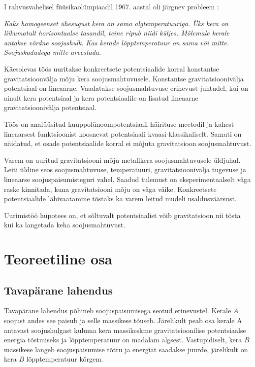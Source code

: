 \documentclass{trkut}%
\begin{document}
\maketitle%
\tableofcontents%
\nummerdame%
I rahvusvahelisel füüsikaolümpiaadil 1967. aastal oli järgnev probleem \cite{ipho67}:

\textit{Kaks homogeenset ühesugust kera on sama algtemperatuuriga. Üks kera on liikumatult horisontaalse tasandil, teine ripub niidi küljes. Mõlemale kerale antakse võrdne soojushulk. Kas kerade lõpptemperatuur on sama või mitte. Soojuskadudega mitte arvestada.}

Käesolevas töös uuritakse konkreetsete potentsiaalide korral konstantse gravitatsioonvälja mõju kera soojusmahtuvusele.
Konstantse gravitatsioonivälja potentsiaal on lineaarne.
Vaadatakse soojusmahtuvuse erinevust juhtudel, kui on ainult kera potentsiaal ja kera potentsiaalile on lisatud lineaarne gravitatsioonivälja potentsiaal.

Töös on analüüsitud kuuppolünoompotentsiaali häirituse meetodil ja kahest lineaarsest funktsioonist koosnevat potentsiaali kvaasi-klassikaliselt. Samuti on näidatud, et osade potentsiaalide korral ei mõjuta gravitatsioon soojusmahtuvust.

Varem on uuritud gravitatsiooni mõju metallkera soojusmahtuvusele üldjuhul.
Leiti üldine seos soojusmahtuvuse, temperatuuri, gravitatsioonivälja tugevuse ja lineaarse soojuspaisumisteguri vahel.
Saadud tulemust on eksperimentaalselt väga raske kinnitada, kuna gravitatsiooni mõju on väga väike. Konkreetsete potentsiaalide läbivaatamine tõstaks ka varem leitud mudeli usaldusväärsust.

Uurimistöö hüpotees on, et sõltuvalt potentsiaalist võib gravitatsioon nii tõsta kui ka langetada keha soojusmahtuvust.
\chapter{Teoreetiline osa}

\section{Tavapärane lahendus}

Tavapärane lahendus põhineb soojuspaisumisega seotud erinevustel. Kerale $A$ soojust andes see paisub ja selle massikese tõuseb. Järelikult peab osa kerale A antavast soojushulgast kuluma kera massikeskme gravitatsioonilise potentsiaalse energia tõstmiseks ja lõpptemperatuur on madalam algsest. Vastupidiselt, kera $B$ massikese langeb soojuspaisumise tõttu ja energiat saadakse juurde, järelikult on kera $B$ lõpptemperatuur kõrgem.
\end{document}
